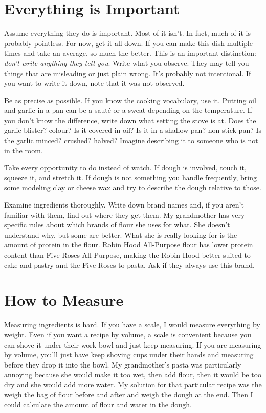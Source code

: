 \section{Everything is Important}
Assume everything they do is important. Most of it isn't. In fact, much of it is probably pointless. For now, get it all down. If you can make this dish multiple times and take an average, so much the better. This is an important distinction: \emph{don't write anything they tell you}. Write what you observe. They may tell you things that are misleading or just plain wrong. It's probably not intentional. If you want to write it down, note that it was not observed.

Be as precise as possible. If you know the cooking vocabulary, use it. Putting oil and garlic in a pan can be a sauté or a sweat depending on the temperature. If you don't know the difference, write down what setting the stove is at. Does the garlic blister? colour? Is it covered in oil? Is it in a shallow pan? non-stick pan? Is the garlic minced? crushed? halved? Imagine describing it to someone who is not in the room.

Take every opportunity to do instead of watch. If dough is involved, touch it, squeeze it, and stretch it. If dough is not something you handle frequently, bring some modeling clay or cheese wax and try to describe the dough relative to those.

Examine ingredients thoroughly. Write down brand names and, if you aren't familiar with them, find out where they get them. My grandmother has very specific rules about which brands of flour she uses for what. She doesn't understand why, but some are better. What she is really looking for is the amount of protein in the flour. Robin Hood All-Purpose flour has lower protein content than Five Roses All-Purpose, making the Robin Hood better suited to cake and pastry and the Five Roses to pasta. Ask if they always use this brand.

\section{How to Measure}
	Measuring ingredients is hard. If you have a scale, I would measure everything by weight. Even if you want a recipe by volume, a scale is convenient because you can shove it under their work bowl and just keep measuring. If you are measuring by volume, you'll just have keep shoving cups under their hands and measuring before they drop it into the bowl. My grandmother's pasta was particularly annoying because she would make it too wet, then add flour, then it would be too dry and she would add more water. My solution for that particular recipe was the weigh the bag of flour before and after and weigh the dough at the end. Then I could calculate the amount of flour and water in the dough.

